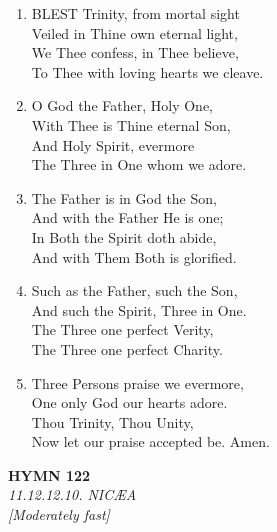 \begin{enumerate}
    \item BLEST Trinity, from mortal sight \\
        Veiled in Thine own eternal light, \\
        We Thee confess, in Thee believe, \\
        To Thee with loving hearts we cleave.

    \item O God the Father, Holy One, \\
        With Thee is Thine eternal Son, \\
        And Holy Spirit, evermore \\
        The Three in One whom we adore.

    \item The Father is in God the Son, \\
        And with the Father He is one; \\
        In Both the Spirit doth abide, \\
        And with Them Both is glorified.

    \item Such as the Father, such the Son, \\
        And such the Spirit, Three in One. \\
        The Three one perfect Verity, \\
        The Three one perfect Charity.

    \item Three Persons praise we evermore, \\
        One only God our hearts adore. \\
        Thou Trinity, Thou Unity, \\
        Now let our praise accepted be. Amen.

\end{enumerate}

\newpage
\begin{center}
    {\Large \textbf{HYMN 122\textdagger{}}}
    \\
    \textit{11.12.12.10. NIC{\AE}A}
    \\
    \textit{\small [Moderately fast]}
\end{center}
\vspace{1em}

